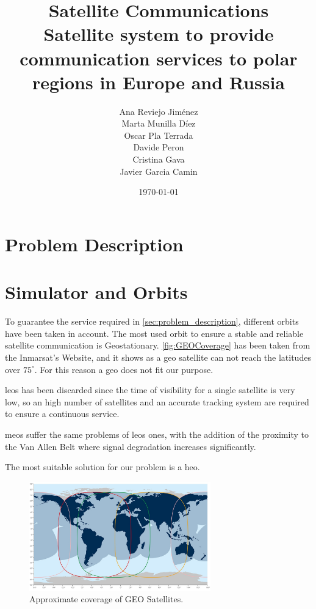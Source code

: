 \documentclass[11pt,a4paper,titlepage]{article}
\title{\blue Satellite Communications \\
\blueb Satellite system to provide communication services to polar regions in Europe and Russia}
\author{Ana Reviejo Jiménez \\ Marta Munilla Díez\\ Oscar Pla Terrada\\ Davide Peron\\ Cristina Gava\\ Javier Garcia Camin}
\date{\today}
\begin{document}
\maketitle

\tableofcontents
\clearpage

\section{Problem Description} \label{sec:problem_description}
	

\section{Simulator and Orbits} \label{sec:orbit}
	To guarantee the service required in \autoref{sec:problem_description}, different orbits have been taken in account.
	The most used orbit to ensure a stable and reliable satellite communication is Geostationary.
	\autoref{fig:GEOCoverage} has been taken from the Inmarsat's Website, and it shows as a \gls{geo} satellite can not reach the latitudes over $75^\circ$. For this reason a \gls{geo} does not fit our purpose.

	\glspl{leo} has been discarded since the time of visibility for a single satellite is very low, so an high number of satellites and an accurate tracking system are required to ensure a continuous service.

	\glspl{meo} suffer the same problems of \glspl{leo} ones, with the addition of the proximity to the Van Allen Belt where signal degradation increases significantly.

	The most suitable solution for our problem is a \gls{heo}.

	\begin{figure}
		\centering
		\includegraphics[width=0.7\textwidth]{figures/GEOCoverage.jpeg}
		\caption{Approximate coverage of GEO Satellites.}
		\label{fig:GEOCoverage}
	\end{figure}
\end{document}
